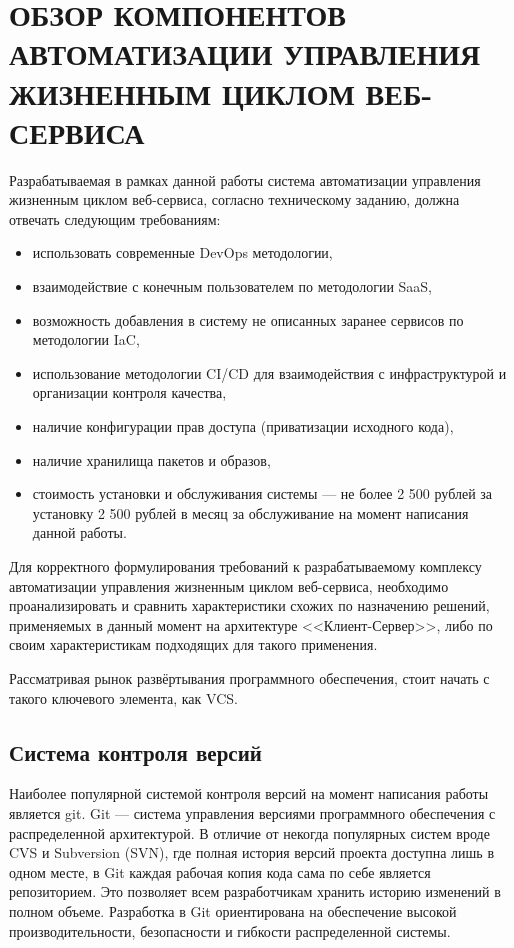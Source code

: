 \chapter{ОБЗОР КОМПОНЕНТОВ АВТОМАТИЗАЦИИ УПРАВЛЕНИЯ ЖИЗНЕННЫМ ЦИКЛОМ ВЕБ-СЕРВИСА}
\label{cha:analysis}

Разрабатываемая в рамках данной работы система автоматизации управления жизненным циклом веб-сервиса,
согласно техническому заданию, должна отвечать следующим требованиям:

\begin{itemize}
    \item использовать современные DevOps методологии,
    \item взаимодействие с конечным пользователем по методологии SaaS,
    \item возможность добавления в систему не описанных заранее сервисов по методологии IaC,
    \item использование методологии CI/CD для взаимодействия с инфраструктурой и организации контроля качества,
    \item наличие конфигурации прав доступа (приватизации исходного кода),
    \item наличие хранилища пакетов и образов,
    \item стоимость установки и обслуживания системы --- не более 2 500 рублей за установку 2 500 рублей в месяц за обслуживание на момент написания данной работы.
\end{itemize}

Для корректного формулирования требований к разрабатываемому комплексу автоматизации управления жизненным циклом веб-сервиса,
необходимо проанализировать и сравнить характеристики схожих по назначению решений, применяемых в данный момент на архитектуре <<Клиент-Сервер>>,
либо по своим характеристикам подходящих для такого применения.

Рассматривая рынок развёртывания программного обеспечения, стоит начать с такого ключевого элемента, как VCS.

\section{Система контроля версий}

Наиболее популярной системой контроля версий на момент написания работы является git\cite{web:git:book}.
Git --- система управления версиями программного обеспечения с распределенной архитектурой.
В отличие от некогда популярных систем вроде CVS и Subversion (SVN),
где полная история версий проекта доступна лишь в одном месте,
в Git каждая рабочая копия кода сама по себе является репозиторием.
Это позволяет всем разработчикам хранить историю изменений в полном объеме.
Разработка в Git ориентирована на обеспечение высокой производительности, безопасности и гибкости распределенной системы.

